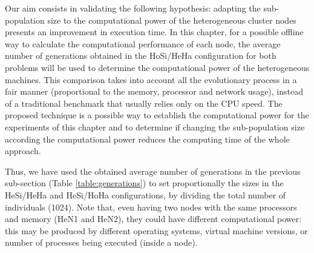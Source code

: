 Our aim consists in validating the following hypothesis: adapting the %
sub-population size to the computational power of the heterogeneous
cluster nodes presents an improvement in execution time. %
In this chapter, for a possible offline way to calculate the computational performance of each node, %
 the average number of generations obtained in the
HoSi/HeHa configuration for both problems will be used to determine the
computational power of the heterogeneous machines. This comparison
takes into account all the evolutionary process in a fair manner
(proportional to the memory, processor and network usage), instead of a
traditional benchmark that usually relies only on the CPU
speed. %
The proposed technique is a possible way to establish the computational power for the experiments of this
chapter and to determine if changing the sub-population size according
the computational power reduces the computing time of the whole
approach. %

Thus, we have used the obtained average number of generations in the
previous sub-section (Table \ref{table:generations}) to set
proportionally the sizes in the HeSi/HeHa and HeSi/HoHa
configurations, by dividing the total number of individuals
(1024). Note that, even having two nodes with the same processors and
memory (HeN1 and HeN2), they could have different computational power:
this may be produced by different operating systems, virtual machine
versions, or number of processes being executed (inside a node). %



